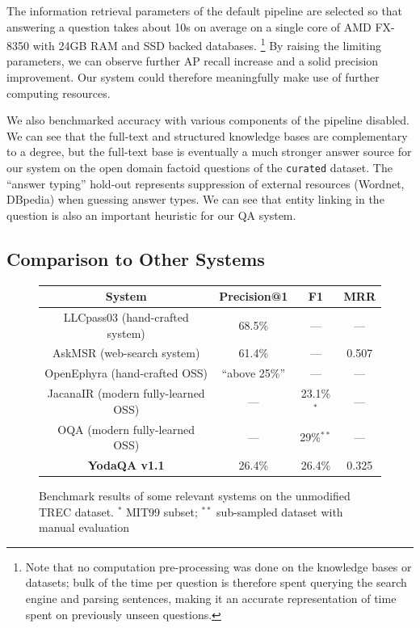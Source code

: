The information retrieval parameters of the default pipeline are selected so
that answering a question takes about 10s on average on a single core of
AMD FX-8350 with 24GB RAM and SSD backed databases.%
\footnote{Note that no computation pre-processing was done on the knowledge bases or datasets;
bulk of the time per question is therefore spent querying the search engine and parsing sentences,
making it an accurate representation of time spent on previously unseen questions.}
By raising the limiting
parameters, we can observe further AP recall increase and a solid precision improvement.
Our system could therefore meaningfully make use of further computing resources.

We also benchmarked accuracy with various components of the pipeline
disabled.  We can see that the full-text and structured knowledge bases
are complementary to a degree, but the full-text base is eventually
a much stronger answer source for our system on the open domain factoid
questions of the \texttt{curated} dataset.  The ``answer typing'' hold-out
represents suppression of external resources (Wordnet, DBpedia) when guessing
answer types.  We can see that entity linking in the question
is also an important heuristic for our QA system.

\subsection{Comparison to Other Systems}

\begin{figure}[ht]
\centering
\begin{tabular}{|c|ccc|}
\hline
System & Precision@1 & F1 & MRR \\ \hline
LLCpass03 \citep{LCC} (hand-crafted system) & 68.5\% & --- & --- \\
AskMSR \citep{AskMSR} (web-search system) & 61.4\% & --- & 0.507 \\ \hline
OpenEphyra \citep{Ephyra2006} (hand-crafted OSS) & ``above 25\%'' & --- & --- \\
JacanaIR \citep{TreeEditIR2013Yao} (modern fully-learned OSS) & --- & 23.1\%$^{*}$ & --- \\
OQA \citep{OQA} (modern fully-learned OSS) & --- & 29\%$^{**}$ & --- \\ \hline
\textbf{YodaQA v1.1} & 26.4\% & 26.4\% & 0.325 \\
\hline
\end{tabular}
\vspace*{-0.2cm}
\caption{Benchmark results of some relevant systems on the unmodified TREC dataset.\qquad
$^{*}$ MIT99 subset;
$^{**}$ sub-sampled dataset with manual evaluation}
\label{fig:trecbench}
\end{figure}

